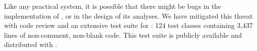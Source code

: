 Like any practical system, it is possible that there might
be bugs in the implementation of \Tool, or in the design of
its analyses. We have mitigated this threat with code review and an extensive
test suite for \Tool:
124 test classes containing
3,437 lines of non-comment, non-blank code.
This test suite is publicly available and distributed with \Tool.
